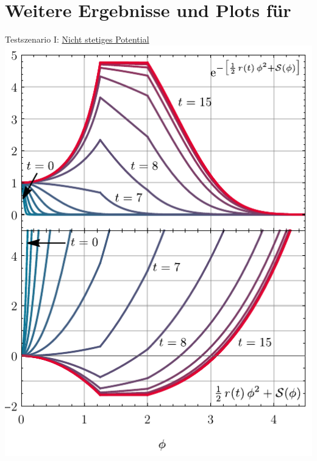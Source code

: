 \section{Weitere Ergebnisse und Plots für }

{\hypersetup{linkcolor=white} 
\begin{frame}{Testszenario I: \hyperlink{0dxmax}{Nicht stetiges Potential}}
\label{0dScII}
	\centering
	\includegraphics[width=0.47\framewidth]{../0d/figures/rg_flow_integrand_z_kink.pdf}\hspace{.5cm}

\end{frame}}
